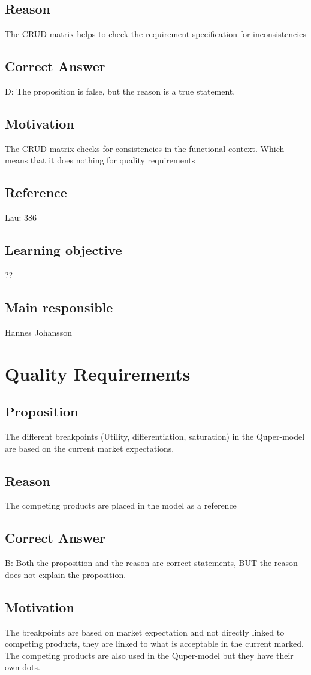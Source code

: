 \documentclass[a4paper]{article}
\begin{document}
\subsection*{Reason}
The CRUD-matrix helps to check the requirement specification for inconsistencies 
\subsection*{Correct Answer}
D: The proposition is false, but the reason is a true statement.
\subsection*{Motivation}
The CRUD-matrix checks for consistencies in the functional context. Which means that it does nothing for quality requirements
\subsection*{Reference}
Lau: 386
\subsection*{Learning objective}
??
\subsection*{Main responsible}
Hannes Johansson

\section{Quality Requirements}
\subsection*{Proposition}
The different breakpoints (Utility, differentiation, saturation) in the Quper-model are based on the current market expectations.
\subsection*{Reason}
The competing products are placed in the model as a reference
\subsection*{Correct Answer}
B: Both the proposition and the reason are correct statements, BUT the reason does not explain the proposition.
\subsection*{Motivation}
The breakpoints are based on market expectation and not directly linked to competing products, they are linked to what is acceptable in the current marked. The competing products are also used in the Quper-model but they have their own dots.
\end{document}
